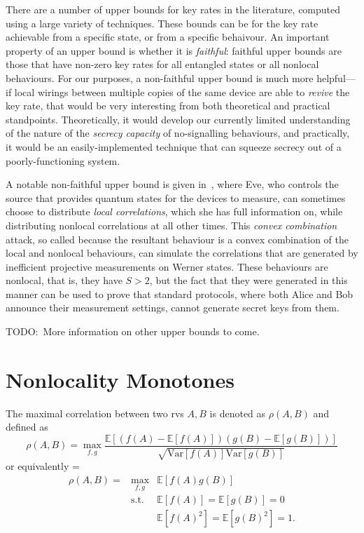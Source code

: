 \documentclass[10pt, a4paper]{article}
\newcommand{\?}{\mathrel{?}} %
\newcommand{\E}{\mathbb{E}} %
\newcommand{\Var}{\mathrm{Var}} %
\newenvironment{Array}[1] %
{\def\arraystretch{1.75}\everymath={\displaystyle}\begin{equation}\begin{array}{#1}}
{\end{array}\end{equation}}
\numberwithin{equation}{section} %
\theoremstyle{definition}
\theoremstyle{plain}
\theoremstyle{plain}
\begin{document}
  There are a number of upper bounds for key rates in the literature, computed using a large variety of techniques. These bounds can be for the key rate achievable from a specific state, or from a specific behaivour. An important property of an upper bound is whether it is \emph{faithful}: faithful upper bounds are those that have non-zero key rates for all entangled states or all nonlocal behaviours. For our purposes, a non-faithful upper bound is much more helpful---if local wirings between multiple copies of the same device are able to \emph{revive} the key rate, that would be very interesting from both theoretical and practical standpoints. Theoretically, it would develop our currently limited understanding of the nature of the \emph{secrecy capacity} of no-signalling behaviours, and practically, it would be an easily-implemented technique that can squeeze secrecy out of a poorly-functioning system.

  A notable non-faithful upper bound is given in~\cite{NotSufficient}, where Eve, who controls the source that provides quantum states for the devices to measure, can sometimes choose to distribute \emph{local correlations}, which she has full information on, while distributing nonlocal correlations at all other times. This \emph{convex combination} attack, so called because the resultant behaviour is a convex combination of the local and nonlocal behaviours, can simulate the correlations that are generated by inefficient projective measurements on Werner states. These behaviours are nonlocal, that is, they have \(S > 2\), but the fact that they were generated in this manner can be used to prove that standard protocols, where both Alice and Bob announce their measurement settings, cannot generate secret keys from them.

  TODO:\ More information on other upper bounds to come.

    \section{Nonlocality Monotones}

    The maximal correlation between two rvs \(A,B\) is denoted as \(\rho(A,B)\) and defined as
    \begin{equation}
      \rho(A,B) = \max_{f,g} \frac{\E[(f(A)-\E[f(A)])(g(B)-\E[g(B)])]}{\sqrt{\Var[f(A)]\Var[g(B)]}}
    \end{equation}
    or equivalently
    \begin{Array}{rcl}
      \rho(A,B) = & \max_{f,g}  & \E[f(A)g(B)] \\
                  & \text{s.t.} & \E[f(A)] = \E[g(B)] = 0 \\
                  &             & \E[f(A)^2] = \E[g(B)^2] = 1.
    \end{Array}
\end{document}
